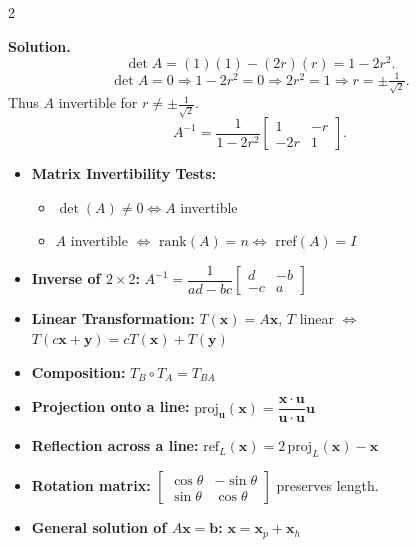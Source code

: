 \documentclass[8pt]{extarticle}
\begin{document}
\begin{multicols}{2}
\begin{tcolorbox}[title=]
\textbf{Solution.}
\[
\det A=(1)(1)-(2r)(r)=1-2r^{2}.
\]
\[
\det A=0\Rightarrow 1-2r^{2}=0\Rightarrow 2r^{2}=1\Rightarrow r=\pm\tfrac{1}{\sqrt{2}}.
\]
Thus \(A\) invertible for \(r\neq \pm\tfrac{1}{\sqrt{2}}\).
\[
A^{-1}=\frac{1}{1-2r^{2}}
\begin{bmatrix}1&-r\\-2r&1\end{bmatrix}.
\]
\end{tcolorbox}

\begin{tcolorbox}[title=Key Formulas and Facts, colframe=black!60!white, colback=gray!2]
\begin{itemize}
\item \textbf{Matrix Invertibility Tests:}
  \begin{itemize}
  \item $\det(A)\neq0 \iff A$ invertible
  \item $A$ invertible $\iff$ $\mathrm{rank}(A)=n \iff$ rref$(A)=I$
  \end{itemize}
\item \textbf{Inverse of $2\times2$:}\quad
$A^{-1}=\dfrac{1}{ad-bc}\begin{bmatrix}d&-b\\-c&a\end{bmatrix}$
\item \textbf{Linear Transformation:}\;
$T(\mathbf{x})=A\mathbf{x}$, \;
$T$ linear $\iff$ $T(c\mathbf{x}+\mathbf{y})=cT(\mathbf{x})+T(\mathbf{y})$
\item \textbf{Composition:}\; $T_B\!\circ T_A = T_{BA}$
\item \textbf{Projection onto a line:}\;
$\mathrm{proj}_{\mathbf{u}}(\mathbf{x})=
\dfrac{\mathbf{x}\cdot\mathbf{u}}{\mathbf{u}\cdot\mathbf{u}}\mathbf{u}$
\item \textbf{Reflection across a line:}\;
$\mathrm{ref}_{L}(\mathbf{x})=2\,\mathrm{proj}_{L}(\mathbf{x})-\mathbf{x}$
\item \textbf{Rotation matrix:}\;
$\begin{bmatrix}\cos\theta&-\sin\theta\\\sin\theta&\cos\theta\end{bmatrix}$ preserves length.
\item \textbf{General solution of $A\mathbf{x}=\mathbf{b}$:}\;
$\mathbf{x}=\mathbf{x}_p+\mathbf{x}_h$
\end{itemize}
\end{tcolorbox}

\end{multicols}
\end{document}
